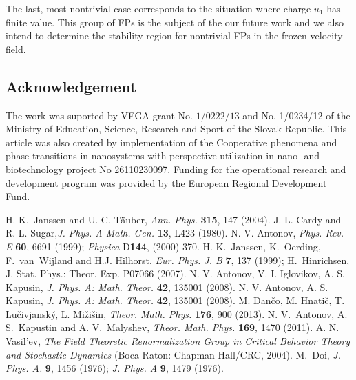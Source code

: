 The last, most nontrivial case corresponds to the situation where charge $u_1$ has finite value. This group of FPs is the subject of the our future work and we also intend to determine the stability region for nontrivial FPs in the frozen velocity field.




\subsection*{Acknowledgement}
The work was suported by VEGA grant No. $1/0222/13$ and No. 1/0234/12
 of the Ministry of Education, Science, Research and Sport of the Slovak Republic. This article was also
created by implementation of the Cooperative phenomena and phase transitions
in nanosystems with perspective utilization in nano- and biotechnology project No
26110230097. Funding for the operational research and development program was
provided by the European Regional Development Fund.

\begin{thebibliography}{99}\addtolength{\itemsep}{-1mm}
 H.-K.~Janssen and U. C. T\"{a}uber, {\it Ann. Phys.} {\bf 315}, 147 (2004).
 J. L. Cardy and R. L. Sugar,{\it J. Phys. A Math. Gen.} {\bf 13}, L423 (1980).
 N. V. Antonov, {\it Phys. Rev. E} {\bf 60}, 6691 (1999); {\it Physica} D{\bf144}, (2000) 370. 
 H.-K.~Janssen, K.~Oerding, F.~van~Wijland and H.J. Hilhorst, {\it Eur. Phys. J. B} {\bf 7}, 137 (1999); H.~Hinrichsen, J. Stat. Phys.: Theor. Exp. P07066 (2007).
 N. V. Antonov, V. I. Iglovikov, A. S. Kapusin, {\it  J. Phys. A: Math. Theor.} {\bf 42},  135001 (2008).
 N. V. Antonov, A. S. Kapusin, {\it  J. Phys. A: Math. Theor.} {\bf 42},  135001 (2008).
 M. Dan\v{c}o, M. Hnati\v{c}, T. Lu\v{c}ivjansk\'{y}, L. Mi\v{z}i\v{s}in, 
 {\it Theor. Math. Phys.} {\bf 176}, 900 (2013).
 N. V.~Antonov, A. S.~Kapustin and A. V.~Malyshev, {\it	Theor. Math. Phys.} {\bf 169}, 1470 (2011).
 A. N. Vasil'ev, \textit{The Field Theoretic
 Renormalization Group in Critical Behavior Theory and Stochastic Dynamics} (Boca Raton: Chapman  Hall/CRC, 2004).
 M.~Doi, {\it J. Phys. A.} {\bf 9}, 1456 (1976); {\it J. Phys. A} {\bf 9}, 1479 (1976).
\end{thebibliography}   

\endinput

%
